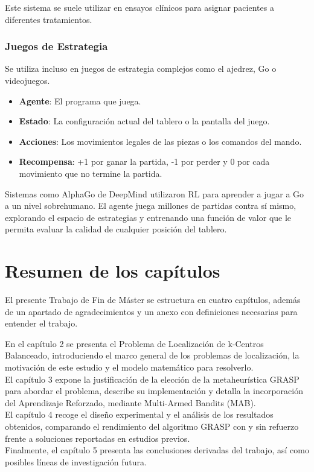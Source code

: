 \documentclass[12pt,a4paper]{book}
\begin{document}
Este sistema se suele utilizar en ensayos clínicos para asignar pacientes a diferentes tratamientos.

\subsubsection{Juegos de Estrategia}

Se utiliza incluso en juegos de estrategia complejos como el ajedrez, Go o videojuegos.

\begin{itemize}
    \item \textbf{Agente}: El programa que juega.
    \item \textbf{Estado}: La configuración actual del tablero o la pantalla del juego.
    \item \textbf{Acciones}: Los movimientos legales de las piezas o los comandos del mando.
    \item \textbf{Recompensa}: +1 por ganar la partida, -1 por perder y 0 por cada movimiento que no termine la partida.
\end{itemize}

Sistemas como AlphaGo \cite{AlphaGo} de DeepMind utilizaron RL para aprender a jugar a Go a un nivel sobrehumano.
El agente juega millones de partidas contra sí mismo, explorando el espacio de estrategias y entrenando una función de valor que le permita evaluar la calidad de cualquier posición del tablero.


\section{Resumen de los capítulos}
El presente Trabajo de Fin de Máster se estructura en cuatro capítulos, además de un apartado de agradecimientos y un anexo con definiciones necesarias para entender el trabajo.

En el capítulo 2 se presenta el Problema de Localización de k-Centros Balanceado, introduciendo el marco general de los problemas de localización, la motivación de este estudio y el modelo matemático para resolverlo.\\
El capítulo 3 expone la justificación de la elección de la metaheurística GRASP para abordar el problema, describe su implementación y detalla la incorporación del Aprendizaje Reforzado, mediante Multi-Armed Bandits (MAB).\\
El capítulo 4 recoge el diseño experimental y el análisis de los resultados obtenidos, comparando el rendimiento del algoritmo GRASP con y sin refuerzo frente a soluciones reportadas en estudios previos.\\
Finalmente, el capítulo 5 presenta las conclusiones derivadas del trabajo, así como posibles líneas de investigación futura.
\end{document}
